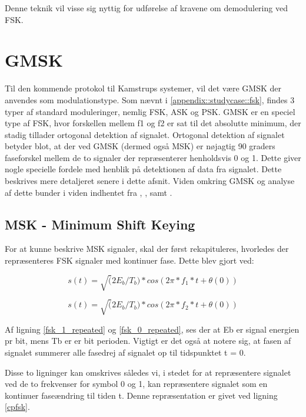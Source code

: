 \begin{appendices}
Denne teknik vil visse sig nyttig for udførelse af kravene om demodulering ved FSK. 

\section{GMSK} \label{appendix::studycase::gmsk}
Til den kommende protokol til Kamstrups systemer, vil det være GMSK der anvendes som modulationstype. Som nævnt i \ref{appendix::studycase::fsk}, findes 3 typer af standard moduleringer, nemlig FSK, ASK og PSK. GMSK er en speciel type af FSK, hvor forskellen mellem f1 og f2 er sat til det absolutte minimum, der stadig tillader ortogonal detektion af signalet. Ortogonal detektion af signalet betyder blot, at der ved GMSK (dermed også MSK) er nøjagtig 90 graders faseforskel mellem de to signaler der repræsenterer henholdsvis 0 og 1. Dette giver nogle specielle fordele med henblik på detektionen af data fra signalet. Dette beskrives mere detaljeret senere i dette afsnit. Viden omkring GMSK og analyse af dette bunder i viden indhentet fra \cite{com-systems}, \cite{sync-technique}, \cite{GMSK-article} samt \cite{GMSK-nutshell}.
\pagebreak 

\subsection{MSK - Minimum Shift Keying}
For at kunne beskrive MSK signaler, skal der først rekapituleres, hvorledes der repræsenteres FSK signaler med kontinuer fase. Dette blev gjort ved:

\begin{equation} \label{fsk_1_repeated}
s(t) = \sqrt(2E_b / T_b) * cos(2 \pi * f_1 * t + \theta(0))
\end{equation}

\begin{equation} \label{fsk_0_repeated}
s(t) = \sqrt(2E_b / T_b) * cos(2 \pi * f_2 * t + \theta(0))
\end{equation}

Af ligning \ref{fsk_1_repeated}  og \ref{fsk_0_repeated}, ses der at Eb er signal energien pr bit, mens Tb er er bit perioden. Vigtigt er det også at notere sig, at fasen af signalet summerer alle fasedrej af signalet op til tidspunktet t = 0. 

Disse to ligninger kan omskrives således vi, i stedet for at repræsentere signalet ved de to frekvenser for symbol 0 og 1, kan repræsentere signalet som en kontinuer faseændring til tiden t. Denne repræsentation er givet ved ligning \ref{cpfsk}.


\end{appendices}
